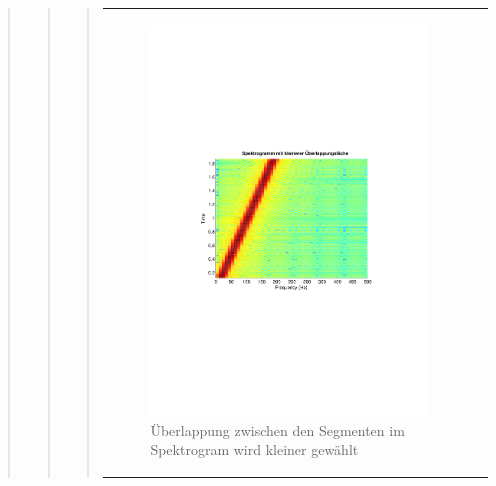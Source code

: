 \begin{quote}
\begin{quote}
\begin{quote}
\begin{center}
\begin{tabular}{ll}
\begin{minipage}{0.6\textwidth}
                        \begin{figure}[H]
                            \label{fig:}
                            \includegraphics[scale=0.63, trim = 3cm 9cm 3cm
                            9cm,
                            clip]{./Bilder/Termin7/bsp_chirp_spectrogram_kleineUeberlappung}
                            \caption{Überlappung zwischen den Segmenten im
                            Spektrogram wird kleiner gewählt}
                        \end{figure}
    
                    \end{minipage}
                    \begin{minipage}{0.6\textwidth}
    

\end{minipage}
\end{tabular}
\end{center}
\end{quote}
\end{quote}
\end{quote}
